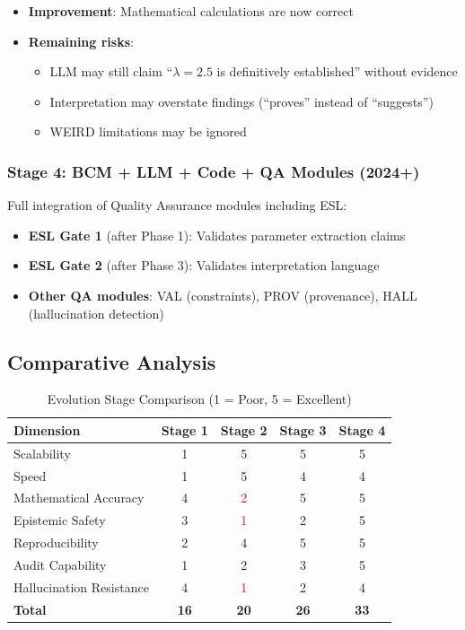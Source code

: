 \documentclass[11pt,a4paper]{article}
\begin{document}
\begin{itemize}
    \item \textbf{Improvement}: Mathematical calculations are now correct
    \item \textbf{Remaining risks}:
    \begin{itemize}
        \item LLM may still claim ``$\lambda = 2.5$ is definitively established'' without evidence
        \item Interpretation may overstate findings (``proves'' instead of ``suggests'')
        \item WEIRD limitations may be ignored
    \end{itemize}
\end{itemize}

\subsubsection{Stage 4: BCM + LLM + Code + QA Modules (2024+)}

Full integration of Quality Assurance modules including ESL:

\begin{itemize}
    \item \textbf{ESL Gate 1} (after Phase 1): Validates parameter extraction claims
    \item \textbf{ESL Gate 2} (after Phase 3): Validates interpretation language
    \item \textbf{Other QA modules}: VAL (constraints), PROV (provenance), HALL (hallucination detection)
\end{itemize}

\subsection{Comparative Analysis}

\begin{table}[h]
\centering
\caption{Evolution Stage Comparison (1 = Poor, 5 = Excellent)}
\label{tab:stage-comparison}
\begin{tabular}{lcccc}
\toprule
\textbf{Dimension} & \textbf{Stage 1} & \textbf{Stage 2} & \textbf{Stage 3} & \textbf{Stage 4} \\
\midrule
Scalability & 1 & 5 & 5 & 5 \\
Speed & 1 & 5 & 4 & 4 \\
Mathematical Accuracy & 4 & \textcolor{red}{2} & 5 & 5 \\
Epistemic Safety & 3 & \textcolor{red}{1} & 2 & 5 \\
Reproducibility & 2 & 4 & 5 & 5 \\
Audit Capability & 1 & 2 & 3 & 5 \\
Hallucination Resistance & 4 & \textcolor{red}{1} & 2 & 4 \\
\midrule
\textbf{Total} & \textbf{16} & \textbf{20} & \textbf{26} & \textbf{33} \\
\bottomrule
\end{tabular}
\end{table}
\end{document}
